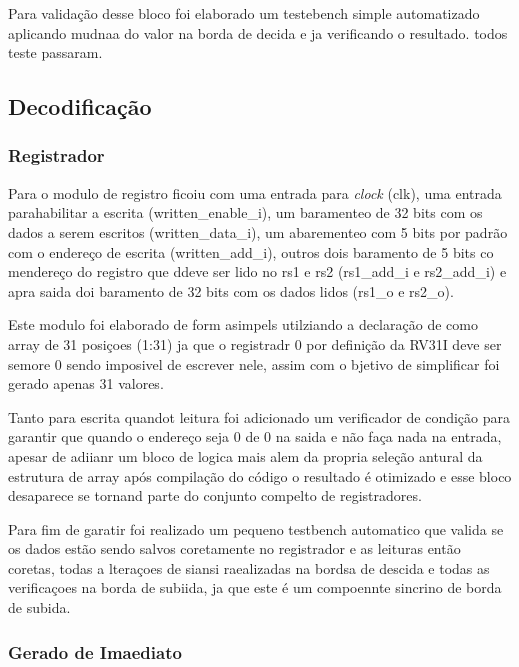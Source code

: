 Para validação desse bloco foi elaborado um testebench simple automatizado aplicando mudnaa do valor na borda de decida e ja verificando o resultado. todos teste passaram.

\subsection{Decodificação}
\label{sub:decodificacao}


\subsubsection{Registrador}
\label{subsub:registrador}

Para o modulo de registro ficoiu com uma entrada para \textit{clock} (clk), uma entrada parahabilitar a escrita (written_enable_i), um baramenteo de 32 bits com os dados a serem escritos (written_data_i), um abarementeo com 5 bits por padrão com o endereço de escrita (written_add_i), outros dois baramento de 5 bits co mendereço do registro que ddeve ser lido no rs1 e rs2 (rs1_add_i e rs2_add_i) e apra saida doi baramento de 32 bits com os dados lidos (rs1_o e rs2_o).

Este modulo foi elaborado de form asimpels utilziando a declaração de como array de 31 posiçoes (1:31) ja que o registradr 0 por definição da RV31I deve ser semore 0 sendo imposivel de escrever nele, assim com o bjetivo de simplificar foi gerado apenas 31 valores.

Tanto para escrita quandot leitura foi adicionado um verificador de condição para garantir que quando o endereço seja 0 de 0 na saida e não faça nada na entrada, apesar de adiianr um bloco de logica mais alem da propria seleção antural da estrutura de array após compilação do código o resultado é otimizado e esse bloco desaparece se tornand parte do conjunto compelto de registradores.

Para fim de garatir foi realizado um pequeno testbench automatico que valida se os dados estão sendo salvos coretamente no registrador e as leituras então coretas, todas a lteraçoes de siansi raealizadas na bordsa de descida e todas as verificaçoes na borda de subiida, ja que este é um compoennte sincrino de borda de subida. 

\subsubsection{Gerado de Imaediato}
\label{subsub:imm_gen}


